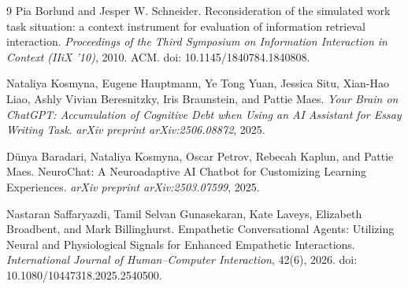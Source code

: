 \documentclass{article}
\begin{document}
\begin{thebibliography}{9}
Pia Borlund and Jesper W. Schneider.
\newblock Reconsideration of the simulated work task situation: a context instrument for evaluation of information retrieval interaction.
\newblock \textit{Proceedings of the Third Symposium on Information Interaction in Context (IIiX '10)}, 2010.
\newblock ACM.
\newblock doi: 10.1145/1840784.1840808.

Nataliya Kosmyna, Eugene Hauptmann, Ye Tong Yuan, Jessica Situ,
Xian-Hao Liao, Ashly Vivian Beresnitzky, Iris Braunstein, and Pattie Maes.
\newblock \textit{Your Brain on ChatGPT: Accumulation of Cognitive Debt when Using an AI Assistant for Essay Writing Task}.
\newblock \emph{arXiv preprint arXiv:2506.08872}, 2025.

Dünya Baradari, Nataliya Kosmyna, Oscar Petrov,
Rebecah Kaplun, and Pattie Maes.
\newblock NeuroChat: A Neuroadaptive AI Chatbot for Customizing Learning Experiences.
\newblock \emph{arXiv preprint arXiv:2503.07599}, 2025.

Nastaran Saffaryazdi, Tamil Selvan Gunasekaran,
Kate Laveys, Elizabeth Broadbent, and Mark Billinghurst.
\newblock Empathetic Conversational Agents: Utilizing Neural and Physiological Signals for Enhanced Empathetic Interactions.
\newblock \emph{International Journal of Human--Computer Interaction}, 42(6), 2026.
\newblock doi: 10.1080/10447318.2025.2540500.
\end{thebibliography}
\end{document}

